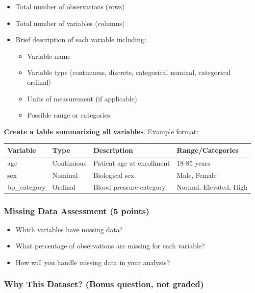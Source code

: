 \documentclass[11pt]{article}
\begin{document}
\begin{itemize}
\item Total number of observations (rows)
\item Total number of variables (columns)
\item Brief description of each variable including:
  \begin{itemize}
  \item Variable name
  \item Variable type (continuous, discrete, categorical nominal, categorical ordinal)
  \item Units of measurement (if applicable)
  \item Possible range or categories
  \end{itemize}
\end{itemize}

\textbf{Create a table summarizing all variables}. Example format:

\begin{center}
\begin{tabular}{|l|l|p{4cm}|l|}
\hline
\textbf{Variable} & \textbf{Type} & \textbf{Description} & \textbf{Range/Categories} \\
\hline
age & Continuous & Patient age at enrollment & 18-85 years \\
\hline
sex & Nominal & Biological sex & Male, Female \\
\hline
bp\_category & Ordinal & Blood pressure category & Normal, Elevated, High \\
\hline
\end{tabular}
\end{center}

\subsubsection{Missing Data Assessment (5 points)}

\begin{itemize}
\item Which variables have missing data?
\item What percentage of observations are missing for each variable?
\item How will you handle missing data in your analysis?
\end{itemize}

\subsubsection{Why This Dataset? (Bonus question, not graded)}
\end{document}
